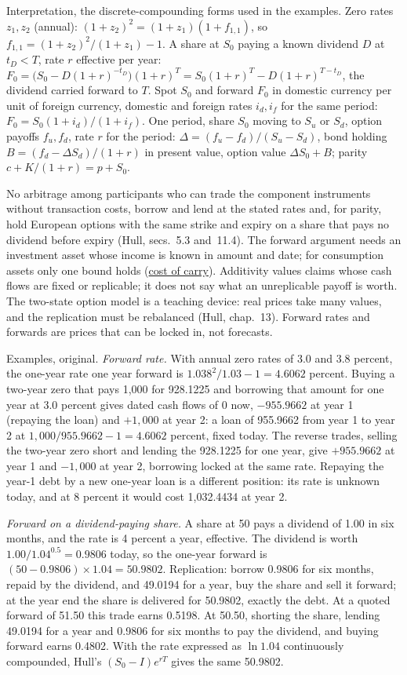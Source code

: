 \begin{qfresult}
 Interpretation, the discrete-compounding forms used in the examples. Zero rates $z_1,z_2$ (annual): $(1+z_2)^2=(1+z_1)(1+f_{1,1})$, so $f_{1,1}=(1+z_2)^2/(1+z_1)-1$. A share at $S_0$ paying a known dividend $D$ at $t_D<T$, rate $r$ effective per year: $F_0=\bigl(S_0-D(1+r)^{-t_D}\bigr)(1+r)^T=S_0(1+r)^T-D(1+r)^{T-t_D}$, the dividend carried forward to $T$. Spot $S_0$ and forward $F_0$ in domestic currency per unit of foreign currency, domestic and foreign rates $i_d,i_f$ for the same period: $F_0=S_0(1+i_d)/(1+i_f)$. One period, share $S_0$ moving to $S_u$ or $S_d$, option payoffs $f_u,f_d$, rate $r$ for the period: $\Delta=(f_u-f_d)/(S_u-S_d)$, bond holding $B=(f_d-\Delta S_d)/(1+r)$ in present value, option value $\Delta S_0+B$; parity $c+K/(1+r)=p+S_0$.

 No arbitrage among participants who can trade the component instruments without transaction costs, borrow and lend at the stated rates and, for parity, hold European options with the same strike and expiry on a share that pays no dividend before expiry (Hull, secs.~5.3 and~11.4). The forward argument needs an investment asset whose income is known in amount and date; for consumption assets only one bound holds (\hyperref[res:cost-of-carry-forward-price]{cost of carry}). Additivity values claims whose cash flows are fixed or replicable; it does not say what an unreplicable payoff is worth. The two-state option model is a teaching device: real prices take many values, and the replication must be rebalanced (Hull, chap.~13). Forward rates and forwards are prices that can be locked in, not forecasts.

 Examples, original. \emph{Forward rate.} With annual zero rates of 3.0 and 3.8 percent, the one-year rate one year forward is $1.038^2/1.03-1=4.6062$ percent. Buying a two-year zero that pays 1{,}000 for 928.1225 and borrowing that amount for one year at 3.0 percent gives dated cash flows of 0 now, $-955.9662$ at year 1 (repaying the loan) and $+1{,}000$ at year 2: a loan of 955.9662 from year 1 to year 2 at $1{,}000/955.9662-1=4.6062$ percent, fixed today. The reverse trades, selling the two-year zero short and lending the 928.1225 for one year, give $+955.9662$ at year 1 and $-1{,}000$ at year 2, borrowing locked at the same rate. Repaying the year-1 debt by a new one-year loan is a different position: its rate is unknown today, and at 8 percent it would cost 1{,}032.4434 at year 2.

\emph{Forward on a dividend-paying share.} A share at 50 pays a dividend of 1.00 in six months, and the rate is 4 percent a year, effective. The dividend is worth $1.00/1.04^{0.5}=0.9806$ today, so the one-year forward is $(50-0.9806)\times1.04=50.9802$. Replication: borrow 0.9806 for six months, repaid by the dividend, and 49.0194 for a year, buy the share and sell it forward; at the year end the share is delivered for 50.9802, exactly the debt. At a quoted forward of 51.50 this trade earns 0.5198. At 50.50, shorting the share, lending 49.0194 for a year and 0.9806 for six months to pay the dividend, and buying forward earns 0.4802. With the rate expressed as $\ln1.04$ continuously compounded, Hull's $(S_0-I)e^{rT}$ gives the same 50.9802.


\end{qfresult}
